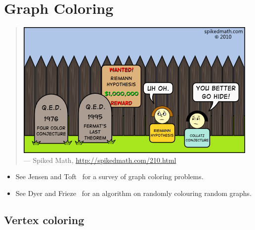 
\chapter{Graph Coloring}
\label{chap:graph_coloring}

\begin{quote}
\includegraphics[scale=1.0]{image/graph-coloring/four-color-conjecture-qed} \\
\noindent
--- Spiked Math,
\url{http://spikedmath.com/210.html}
\end{quote}

\begin{itemize}
\item See Jensen and Toft~\cite{JensenToft1995} for a survey of graph
  coloring problems.

\item See Dyer and Frieze~\cite{DyerFrieze2010} for an algorithm on
  randomly colouring random graphs.
\end{itemize}


\section{Vertex coloring}


